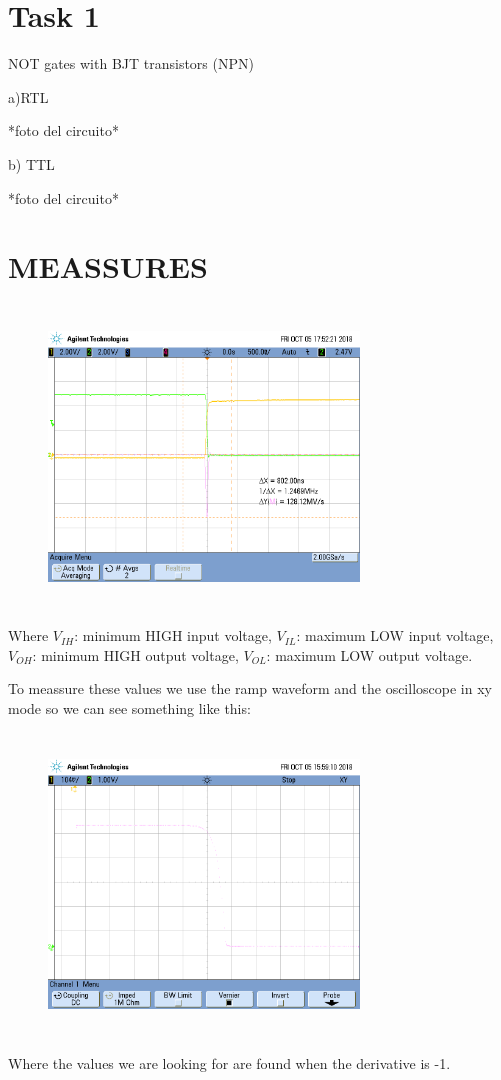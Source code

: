\documentclass[a4paper,12pt]{article}
\begin{document}
\section*{Task 1}
NOT gates with BJT transistors (NPN)

a)RTL

*foto del circuito*

b) TTL

*foto del circuito*

\section*{MEASSURES}

\begin{figure}[H] 
\begin{center}
\includegraphics[width=8.25cm,height=8cm]{imax1.png}
\end{center}
\caption{}
\label{fig:measures}
\end{figure} 

Where $V_{IH}$: minimum HIGH input voltage, $V_{IL}$: maximum LOW input voltage, $V_{OH}$: minimum HIGH output voltage, $V_{OL}$: maximum LOW output voltage.

To meassure these values we use the ramp waveform and the oscilloscope in xy mode so we can see something like this:
\begin{figure}[H] 
    \begin{center}
    \includegraphics[width=8.25cm,height=8cm]{xy_ttl_bjt.png}
    \end{center}
    \caption{}
    \label{fig:measures}
    \end{figure}     
Where the values we are looking for are found when the derivative is -1.
\end{document}
